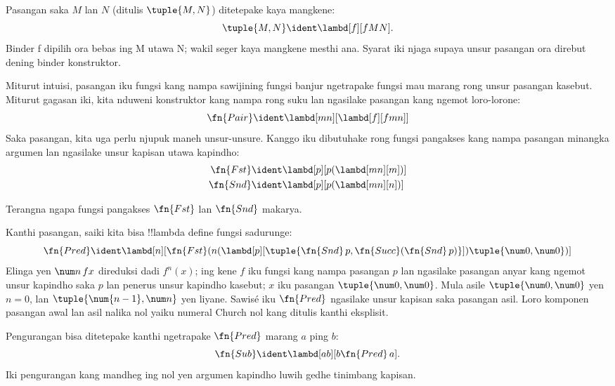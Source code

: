 \documentclass[../../../include/open-logic-section]{subfiles}
\begin{document}

\begin{defn}
Pasangan saka $M$ lan $N$
(ditulis $\tuple{M,N}$)
ditetepake kaya mangkene:
\[
\tuple{M,N} \ident \lambd[f][fMN].
\]
Binder f dipilih ora bebas ing M utawa N; wakil seger kaya mangkene mesthi ana. Syarat iki njaga supaya unsur pasangan ora direbut dening binder konstruktor.
\end{defn}
  
Miturut intuisi, pasangan iku
fungsi kang nampa sawijining
fungsi banjur ngetrapake
fungsi mau marang rong unsur
pasangan kasebut.
Miturut gagasan iki, kita
nduweni konstruktor kang
nampa rong suku lan ngasilake
pasangan kang ngemot
loro-lorone:
\[
  \fn{Pair} \ident \lambd[mn][\lambd[f][fmn]]
\]
Saka pasangan, kita uga
perlu njupuk maneh
unsur-unsure.
Kanggo iku dibutuhake
rong fungsi pangakses
kang nampa pasangan minangka
argumen lan ngasilake
unsur kapisan utawa kapindho:
\begin{align*}
  \fn{Fst} & \ident \lambd[p][p(\lambd[mn][m])]\\
  \fn{Snd} & \ident \lambd[p][p(\lambd[mn][n])]
\end{align*}

\begin{prob}
  Terangna ngapa fungsi
  pangakses $\fn{Fst}$
  lan $\fn{Snd}$ makarya.
\end{prob}

Kanthi pasangan, saiki kita
bisa !!{lambda define}
fungsi sadurunge:
\[
  \fn{Pred} \ident \lambd[n][\fn{Fst}(n (\lambd[p][\tuple{\fn{Snd}\, {p}, \fn{Succ}(\fn{Snd}\, {p})}]) \tuple{\num 0, \num 0})]
\]
Elinga yen $\num n\, f x$
direduksi dadi $f^{n}(x)$;
ing kene $f$ iku fungsi kang
nampa pasangan $p$ lan
ngasilake pasangan anyar
kang ngemot unsur kapindho
saka $p$ lan penerus
unsur kapindho kasebut;
$x$ iku pasangan
$\tuple{\num 0,\num 0}$.
Mula asile
$\tuple{\num 0,\num 0}$
yen $n=0$, lan
$\tuple{\num{n-1}, \num n}$
yen liyane.
Sawisé iku $\fn{Pred}$
ngasilake unsur kapisan
saka pasangan asil. Loro komponen pasangan awal lan asil nalika nol yaiku numeral Church nol kang ditulis kanthi eksplisit.

Pengurangan bisa ditetepake
kanthi ngetrapake
$\fn{Pred}$ marang $a$
ping $b$:
\[
\fn{Sub} \ident \lambd[ab][b \fn{Pred}\, a].
\] Iki pengurangan kang mandheg ing nol yen argumen kapindho luwih gedhe tinimbang kapisan.
    
\end{document}
